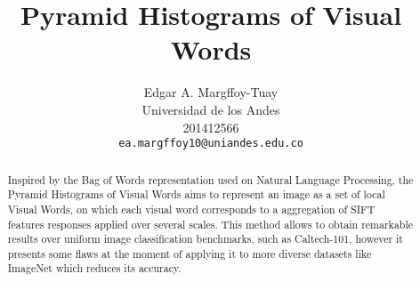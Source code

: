 \documentclass[10pt,twocolumn,letterpaper]{article}
\begin{document}
\title{Pyramid Histograms of Visual Words}

\author{Edgar A. Margffoy-Tuay\\
Universidad de los Andes\\
201412566\\
{\tt\small ea.margffoy10@uniandes.edu.co}
}

\maketitle

\begin{abstract}
Inspired by the Bag of Words representation used on Natural Language Processing, the Pyramid Histograms of Visual Words aims to represent an image as a set of local Visual Words, on which each visual word corresponds to a aggregation of SIFT features responses applied over several scales. This method allows to obtain remarkable results over uniform image classification benchmarks, such as Caltech-101, however it presents some flaws at the moment of applying it to more diverse datasets like ImageNet which reduces its accuracy.
\end{abstract}


\end{document}
